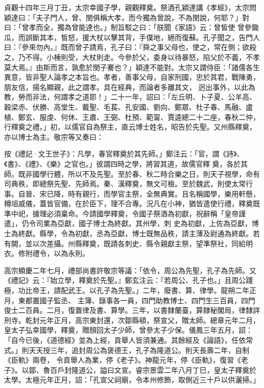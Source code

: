 \begin{pinyinscope}
 貞觀十四年三月丁丑，太宗幸國子學，親觀釋奠。祭酒孔穎達講《孝經》，太宗問穎達曰：「夫子門人，曾、閔俱稱大孝，而今獨為曾說，不為閔說，何耶？」對曰：「曾孝而全，獨為曾能達也。」制旨駁之曰：「朕聞《家語》云：曾皙使
 曾參鋤瓜，而誤斷其本，皙怒，援大杖以擊其背，手僕地，絕而復蘇。孔子聞之，告門人曰：『參來勿內。』既而曾子請焉，孔子曰：『舜之事父母也，使之，常在側；欲殺之，乃不得。小棰則受，大杖則走。今參於父，委身以待暴怒，陷父於不義，不孝莫大焉。』由斯而言，孰愈於閔子騫也？」穎達不能對。太宗又謂侍臣：「諸儒各生異意，皆非聖人論孝之本旨也。孝者，善事父母，自家刑國，忠於其君，戰陳勇，朋友信，揚名顯親，此之謂孝。具在經典，而論者多離其文，
 迥出事外，以此為教，勞而非法，何謂孝之道耶！」二十一年，詔曰：「左丘明、卜子夏、公羊高、穀梁赤、伏勝、高堂生、戴聖、毛萇、孔安國、劉向、鄭眾、杜子春、馬融、盧植、鄭玄、服虔、何休、王肅、王弼、杜預、範甯、賈逵總二十二座，春秋二仲，行釋奠之禮。」初，以儒官自為祭主，直云博士姓名，昭告於先聖。又州縣釋奠，亦以博士為主。敬宗等又奏曰：



 按《禮記·文王世子》：凡學，春官釋奠於其先師。」鄭注云：「官，謂《詩》、《書》、《禮》、《樂》之官也。」彼謂四時之學，將習其道，故儒官釋
 奠，各於其師。既非國學行體，所以不及先聖。至於春、秋二時合樂之日，則天子視學，命有司典秩，即總祭先聖、先師焉。秦、漢釋奠，無文可檢。至於魏武，則使太常行事。自晉、宋已降，時有親行，而學官主祭，全無典實。且名稱國學，樂用軒懸，樽俎威儀，蓋皆官備，在於臣下，理不合專。況凡在小神，猶皆遣使行禮，釋奠既準中祀，據理必須稟命。今請國學釋奠，令國子祭酒為初獻，祝辭稱「皇帝謹遣」，仍令司業為亞獻，國子博士為終獻。其州學，刺
 史為初獻，上佐為亞獻，博士為終獻。縣學，令為初獻，丞為亞獻，博士既無品秩，請主薄及尉通為終獻。若有闕，並以次差攝。州縣釋奠，既請各刺史、縣令親獻主祭，望準祭社，同給明衣。修附禮令，以為永則。



 高宗顯慶二年七月，禮部尚書許敬宗等議：「依令，周公為先聖，孔子為先師。又《禮記》云：『始立學，釋奠於先聖。』鄭玄注云：『若周公、孔子也。」且周公踐極，功比帝王，請配武王。以孔子為先聖。」二年，廢書、算、律學。龍朔二年正月，東都置國子監丞、
 主簿、錄事各一員，四門助教博士、四門生三百員，四門俊士二百員。二月，復置律及書、算學。三年，以書隸蘭臺，算隸秘閣局，律隸詳刑寺。乾封元年正月，高宗東封還，次鄒縣頓，祭宣父，贈太師。總章元年二月，皇太子弘幸國學，釋奠，贈顏回太子少師，曾參太子少保。儀鳳三年五月，詔：「自今已後，《道德經》並為上經，貢舉人皆須兼通。其餘經及《論語》，任依常式。」則天天授三年，追封周公為褒德王，孔子為隆道公。則天長壽二年，自制《臣軌》兩卷，
 令貢舉人為業，停《老子》。神龍元年，停《臣軌》，復習《老子》。以鄒、魯百戶封隆道公，謚曰文宣。睿宗景雲二年八月丁巳，皇太子釋奠於太學。太極元年正月，詔：「孔宣父祠廟，令本州修飾，取側近三十戶以供灑掃。」




\end{pinyinscope}
